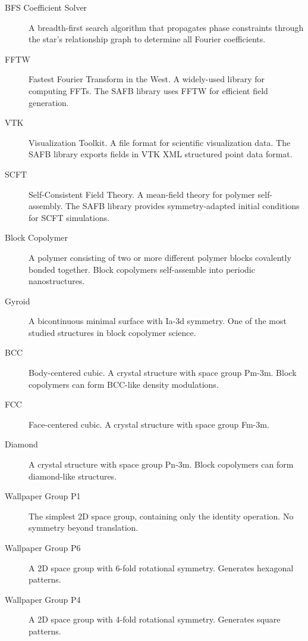 \begin{description}
\item[BFS Coefficient Solver] A breadth-first search algorithm that propagates phase constraints through the star's relationship graph to determine all Fourier coefficients.

\item[FFTW] Fastest Fourier Transform in the West. A widely-used library for computing FFTs. The SAFB library uses FFTW for efficient field generation.

\item[VTK] Visualization Toolkit. A file format for scientific visualization data. The SAFB library exports fields in VTK XML structured point data format.

\item[SCFT] Self-Consistent Field Theory. A mean-field theory for polymer self-assembly. The SAFB library provides symmetry-adapted initial conditions for SCFT simulations.

\item[Block Copolymer] A polymer consisting of two or more different polymer blocks covalently bonded together. Block copolymers self-assemble into periodic nanostructures.

\item[Gyroid] A bicontinuous minimal surface with Ia-3d symmetry. One of the most studied structures in block copolymer science.

\item[BCC] Body-centered cubic. A crystal structure with space group Pm-3m. Block copolymers can form BCC-like density modulations.

\item[FCC] Face-centered cubic. A crystal structure with space group Fm-3m.

\item[Diamond] A crystal structure with space group Pn-3m. Block copolymers can form diamond-like structures.

\item[Wallpaper Group P1] The simplest 2D space group, containing only the identity operation. No symmetry beyond translation.

\item[Wallpaper Group P6] A 2D space group with 6-fold rotational symmetry. Generates hexagonal patterns.

\item[Wallpaper Group P4] A 2D space group with 4-fold rotational symmetry. Generates square patterns.

\end{description}
